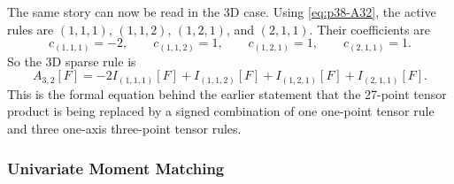 \documentclass[11pt]{article}
\numberwithin{equation}{section}
\begin{document}
The same story can now be read in the 3D case.  Using
\eqref{eq:p38-A32}, the active rules are
\((1,1,1)\), \((1,1,2)\), \((1,2,1)\), and \((2,1,1)\).  Their coefficients are
\begin{equation}
  c_{(1,1,1)}=-2,
  \qquad
  c_{(1,1,2)}=1,
  \qquad
  c_{(1,2,1)}=1,
  \qquad
  c_{(2,1,1)}=1.
  \label{eq:p38-3d-smolyak-coeffs-repeat}
\end{equation}
So the 3D sparse rule is
\begin{equation}
  A_{3,2}[F]
  =
  -2I_{(1,1,1)}[F]+I_{(1,1,2)}[F]+I_{(1,2,1)}[F]+I_{(2,1,1)}[F].
  \label{eq:p38-3d-smolyak-rule}
\end{equation}
This is the formal equation behind the earlier statement that the 27-point tensor
product is being replaced by a signed combination of one one-point tensor rule
and three one-axis three-point tensor rules.

\subsubsection{Univariate Moment Matching}
\label{subsec:p32-univariate-moment-matching}
\end{document}
